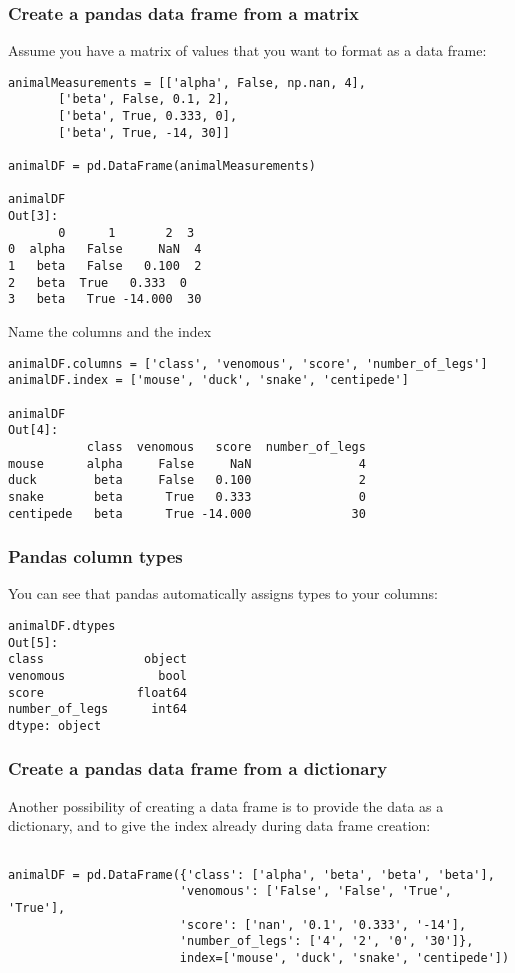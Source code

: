 \documentclass[12pt]{article}
\begin{document}
\subsubsection{Create a pandas data frame from a matrix}
Assume you have a matrix of values that you want to format as a data frame:
\begin{verbatim}
animalMeasurements = [['alpha', False, np.nan, 4],
       ['beta', False, 0.1, 2],
       ['beta', True, 0.333, 0],
       ['beta', True, -14, 30]]

animalDF = pd.DataFrame(animalMeasurements)

animalDF
Out[3]: 
       0      1       2  3
0  alpha   False     NaN  4
1   beta   False   0.100  2
2   beta  True   0.333  0
3   beta   True -14.000  30

\end{verbatim}
Name the columns and the index
\begin{verbatim}
animalDF.columns = ['class', 'venomous', 'score', 'number_of_legs']
animalDF.index = ['mouse', 'duck', 'snake', 'centipede']

animalDF
Out[4]: 
           class  venomous   score  number_of_legs
mouse      alpha     False     NaN               4
duck        beta     False   0.100               2
snake       beta      True   0.333               0
centipede   beta      True -14.000              30

\end{verbatim}
\subsubsection{Pandas column types}
You can see that pandas automatically assigns types to your columns:
\begin{verbatim}
animalDF.dtypes
Out[5]: 
class              object
venomous             bool
score             float64
number_of_legs      int64
dtype: object

\end{verbatim}
\subsubsection{Create a pandas data frame from a dictionary}
Another possibility of creating a data frame is to provide the data as a dictionary, and to give the index already during data frame creation:
\begin{verbatim}

animalDF = pd.DataFrame({'class': ['alpha', 'beta', 'beta', 'beta'],
       					'venomous': ['False', 'False', 'True', 'True'],
       					'score': ['nan', '0.1', '0.333', '-14'],
       					'number_of_legs': ['4', '2', '0', '30']}, 
						index=['mouse', 'duck', 'snake', 'centipede'])

\end{verbatim}
\end{document}
